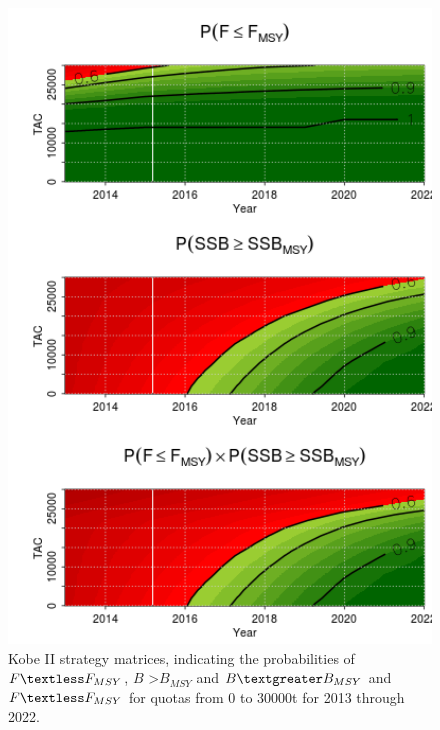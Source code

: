 \documentclass[a4paper, 10pt]{article}
\begin{document}
\begin{figure}[!ht]\begin{center}\includegraphics[width=6in]{k2sm.png}\end{center}
\caption{Kobe II strategy matrices, indicating the probabilities of  $F \textless F_{MSY}$, $B$ \textgreater $B_{MSY}$ and $B \textgreater B_{MSY}$ and 
$F \textless F_{MSY}$ for quotas from 0 to 30000t for 2013 through 2022.}
\label{fig:5}\end{figure}

\clearpage
\newpage
\end{document}
